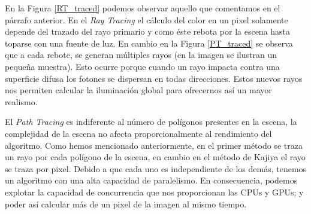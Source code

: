 \documentclass[titlepage,12pt]{report}
\begin{document}
En la Figura \ref{RT_traced} podemos observar aquello que comentamos en el párrafo anterior. En el \textit{Ray Tracing} el cálculo del color en un pixel solamente depende del trazado del rayo primario y como éste rebota por la escena hasta toparse con una fuente de luz. En cambio en la Figura \ref{PT_traced} se observa que a cada rebote, se generan múltiples rayos (en la imagen se ilustran un pequeña muestra). Esto ocurre porque cuando un rayo impacta contra una superficie difusa los fotones se dispersan en todas direcciones. Estos nuevos rayos nos permiten calcular la iluminación global para ofrecernos así un mayor realismo. 

El \textit{Path Tracing} es indiferente al número de polígonos presentes en la escena, la complejidad de la escena no afecta proporcionalmente al rendimiento del algoritmo. Como hemos mencionado anteriormente, en el primer método se traza un rayo por cada polígono de la escena, en cambio en el método de Kajiya el rayo se traza por pixel. Debido a que cada uno es independiente de los demás, tenemos un algoritmo con una alta capacidad de paralelismo. En consecuencia, podemos explotar la capacidad de concurrencia que nos proporcionan las CPUs y GPUs; y poder así calcular más de un pixel de la imagen al mismo tiempo.
\end{document}
